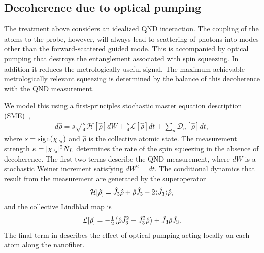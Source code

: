 \documentclass[preprint, aps,pra,onecolumn]{revtex4-1} %
\newcommand{\jz}{\hat{J}_3}
\newcommand{\chieff}{\chi_{\raisebox{-.1pt}{\tiny $J_3$}}}
\begin{document}
	\subsection{Decoherence due to optical pumping}\label{sec:decoherence}
	
The treatment above considers an idealized QND interaction. 
The coupling of the atoms to the probe, however, will always lead to scattering of photons into modes other than the forward-scattered guided mode.  
This is accompanied by optical pumping that destroys the entanglement associated with spin squeezing.  In addition it reduces the metrologically useful signal.  
The maximum achievable metrologically relevant squeezing is determined by the balance of this decoherence with the QND measurement. 

We model this using a first-principles stochastic master equation description (SME)~\cite{jacobs_straightforward_2006, baragiola_three-dimensional_2014},
	\begin{align} \label{Eq::SME}
		d \hat{\rho} = s\sqrt{\frac{\kappa}{4}} \mathcal{H}[\hat{\rho}] dW + \frac{\kappa}{4} \mathcal{L}[\hat{\rho}] dt + \sum_n \mathcal{D}_n [\hat{\rho}] dt,
	\end{align}
where $s = {\rm sign}(\chieff)$ and $\hat{\rho}$ is the collective atomic state. 
The measurement strength $\kappa =|\chieff|^2 \dot{N}_L$ determines the rate of the spin squeezing in the absence of decoherence.  
The first two terms describe the QND measurement, where $dW$ is a stochastic Weiner increment satisfying $dW^2 = dt$. 
The conditional dynamics that result from the measurement are generated by the superoperator
	\begin{align}
		\mathcal{H}[\hat{\rho}] = \jz \hat{\rho} + \hat{\rho} \jz - 2 \expt{\jz} \hat{\rho},
	\end{align}
and the collective Lindblad map is
	\begin{align}
		\mathcal{L}[\hat{\rho}] = - \smallfrac{1}{2} \big( \hat{\rho}  \jz^2 + \jz^2 \hat{\rho} \big) + \jz \hat{\rho} \jz.
	\end{align}
The final term in  describes the effect of optical pumping acting locally on each atom along the nanofiber. 
\end{document}
